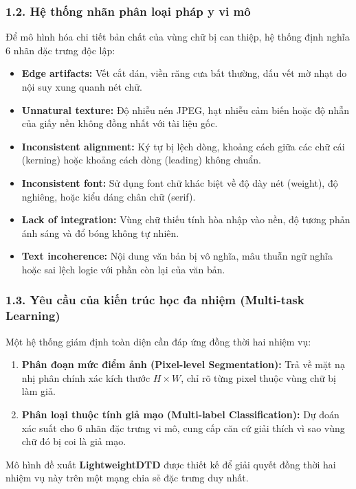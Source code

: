 \subsubsection{1.2. Hệ thống nhãn phân loại pháp y vi mô}
\indent\indent Để mô hình hóa chi tiết bản chất của vùng chữ bị can thiệp, hệ thống định nghĩa 6 nhãn đặc trưng độc lập:
\begin{itemize}[label={--}, itemsep=2pt]
    \item \textbf{Edge artifacts:} Vết cắt dán, viền răng cưa bất thường, dấu vết mờ nhạt do nội suy xung quanh nét chữ.
    \item \textbf{Unnatural texture:} Độ nhiễu nén JPEG, hạt nhiễu cảm biến hoặc độ nhẵn của giấy nền không đồng nhất với tài liệu gốc.
    \item \textbf{Inconsistent alignment:} Ký tự bị lệch dòng, khoảng cách giữa các chữ cái (kerning) hoặc khoảng cách dòng (leading) không chuẩn.
    \item \textbf{Inconsistent font:} Sử dụng font chữ khác biệt về độ dày nét (weight), độ nghiêng, hoặc kiểu dáng chân chữ (serif).
    \item \textbf{Lack of integration:} Vùng chữ thiếu tính hòa nhập vào nền, độ tương phản ánh sáng và đổ bóng không tự nhiên.
    \item \textbf{Text incoherence:} Nội dung văn bản bị vô nghĩa, mâu thuẫn ngữ nghĩa hoặc sai lệch logic với phần còn lại của văn bản.
\end{itemize}

\subsubsection{1.3. Yêu cầu của kiến trúc học đa nhiệm (Multi-task Learning)}
\indent\indent Một hệ thống giám định toàn diện cần đáp ứng đồng thời hai nhiệm vụ:
\begin{enumerate}
    \item \textbf{Phân đoạn mức điểm ảnh (Pixel-level Segmentation):} Trả về mặt nạ nhị phân chính xác kích thước $H \times W$, chỉ rõ từng pixel thuộc vùng chữ bị làm giả.
    \item \textbf{Phân loại thuộc tính giả mạo (Multi-label Classification):} Dự đoán xác suất cho 6 nhãn đặc trưng vi mô, cung cấp căn cứ giải thích vì sao vùng chữ đó bị coi là giả mạo.
\end{enumerate}
Mô hình đề xuất \textbf{LightweightDTD} được thiết kế để giải quyết đồng thời hai nhiệm vụ này trên một mạng chia sẻ đặc trưng duy nhất.

